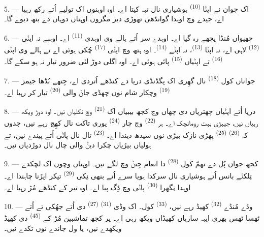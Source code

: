 5. --- اک جوان نے اپݨا  \textsuperscript{(10)} ہوشیاری نال تہہ کیتا
اے۔ اوہ اوہنوں اک تولیے اُتے رکھ رہیا اے، جیدے وچ اوہدا گوانڈھی تھوڑی دیر مگروں
اوہناں دوہاں دے  بنھ دیوے گا۔

6. --- چھیواں مُنڈا پچھے رہ گیا اے۔ اوہدے سر اُتے ہالے وی اوہدی 
\textsuperscript{(11)} اے۔ اوہنے نہ اپݨی  \textsuperscript{(12)} لاہی
اے، نہ اپݨا  \textsuperscript{(13)}، نہ اپݨے 
\textsuperscript{(14)}۔ اوہ ہتھ وچ اپݨی  \textsuperscript{(17)} چُکی
ہوئی اے تے ہالے وی اپݨی  \textsuperscript{(16)} تے اپݨیاں
 \textsuperscript{(15)} پائی ہوئی اے۔ اوہ اگلی دوڑ لئی ضرور تیار نہ
ہو سکے گا۔

7. --- جواناں کول  \textsuperscript{(18)} نال گھِری اک پگڈنڈی
دریا دے کنڈھے اُتردی اے، جِتھے بُڈھا جیمز  \textsuperscript{(19)}
وچکار شام نوں چھڈی جاݨ والی  \textsuperscript{(20)} تیار کر رہیا
اے۔

\VUsaut{4.4mm}
\VUsaut{3.4mm}

8. --- دریا اُتے اپݨیاں چھتریاں دی چھاں وچ کجھ بیبیاں اک 
\textsuperscript{(21)} وچ نکلیاں نیں۔ اوہ دوڑ ویکھ رہیاں نیں، جیہڑی بہت رومانچک
اے۔ ہر  \textsuperscript{(22)} وچ چار 
\textsuperscript{(24)} پوری تاکت نال کھِچ رہے نیں، جدوں کہ 
\textsuperscript{(26)}  \textsuperscript{(25)} پھڑی نازک بیڑی نوں سیدھ
دیندا اے۔  \textsuperscript{(23)} تال نال پاݨی اُتے پیندے نیں، تے
ہولیاں بیڑیاں چکرا دیݨ والی چال نال دوڑدیاں نیں۔

9. --- کجھ جوان پُل دے تھمّ کول  \textsuperscript{(28)} دا
انعام جِتݨ وچ لگے نیں۔ اوہناں وچوں اک لچکدے تِلکݨے بانس اُتے ہوشیاری نال سرکدا
ہویا سرے اُتے بنھی نِکی  \textsuperscript{(29)} تیکر اپڑنا چاہندا اے۔
اوہدا نِگھرا  \textsuperscript{(30)} پاݨی وچ ڈِگ پیا اے۔ اوہ تیر کے
کنڈھے مُڑ رہیا اے۔

10. --- وڈے مُنڈے  \textsuperscript{(32)} کھیڈ رہے نیں،
 \textsuperscript{(33)} کول۔ اک وڈی  \textsuperscript{(31)}
 \textsuperscript{(27)} دی  اُتے جھُکی تے
 اُتے ٹھسا ٹھس بھری ایہہ ساریاں کھیڈاں ویکھ رہی اے۔ پر کجھ تماشبین
مُڑ کے  \textsuperscript{(45)} دی کھیڈ ویکھدے نیں، یا
 ول جاندے  نوں تکدے نیں۔

